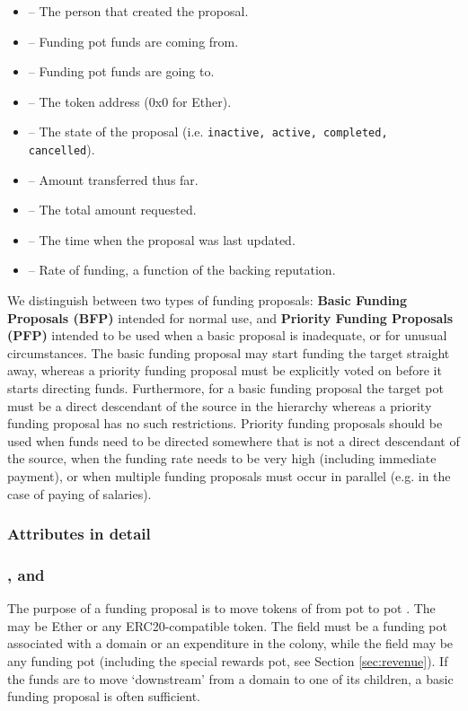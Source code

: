 \begin{itemize}
  \item {} -- The person that created the proposal.
  \item {} -- Funding pot funds are coming from.
  \item {} -- Funding pot funds are going to.
  \item {} -- The token address (0x0 for Ether).
  \item {} -- The state of the proposal (i.e. \texttt{inactive, active, completed, cancelled}).
  \item {} -- Amount transferred thus far.
  \item {} -- The total amount requested.
  \item {} -- The time when the proposal was last updated.
  \item {} -- Rate of funding, a function of the backing reputation.
 \end{itemize}

We distinguish between two types of funding proposals: \textbf{Basic Funding Proposals (BFP)} intended for normal use, and \textbf{Priority Funding Proposals (PFP)} intended to be used when a basic proposal is inadequate, or for unusual circumstances. The basic funding proposal may start funding the target straight away, whereas a priority funding proposal must be explicitly voted on before it starts directing funds. Furthermore, for a basic funding proposal the target pot must be a direct descendant of the source in the hierarchy whereas a priority funding proposal has no such restrictions. Priority funding proposals should be used when funds need to be directed somewhere that is not a direct descendant of the source, when the funding rate needs to be very high (including immediate payment), or when multiple funding proposals must occur in parallel (e.g. in the case of paying of salaries).

\subsubsection{Attributes in detail}

\subsubsection*{,  and }
The purpose of a funding proposal is to move tokens of  from pot  to pot . The  may be Ether or any ERC20-compatible token. The  field must be a funding pot associated with a domain or an expenditure in the colony, while the  field may be any funding pot (including the special rewards pot, see Section \ref{sec:revenue}). If the funds are to move `downstream' from a domain to one of its children, a basic funding proposal is often sufficient.

